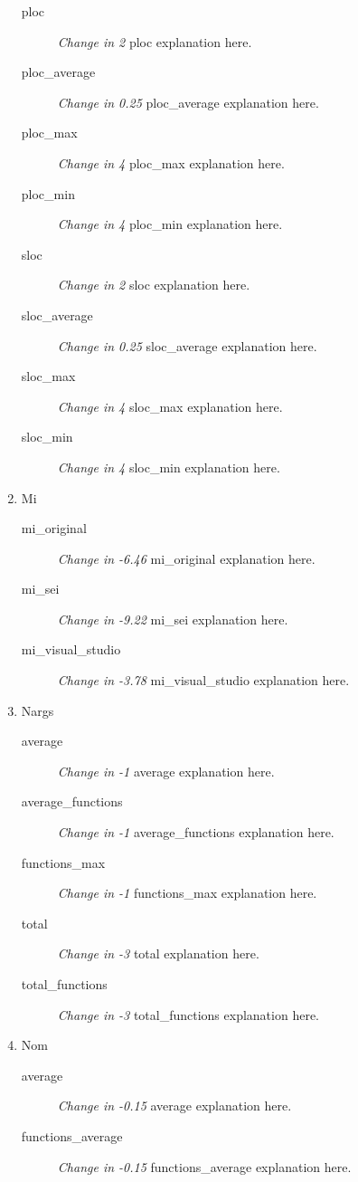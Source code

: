 \begin{enumerate}
\begin{description}
                  \item [ploc] \textit{Change in 2} ploc explanation here.
                  \item [ploc\_average] \textit{Change in 0.25} ploc\_average explanation here.
                  \item [ploc\_max] \textit{Change in 4} ploc\_max explanation here.
                  \item [ploc\_min] \textit{Change in 4} ploc\_min explanation here.
                  \item [sloc] \textit{Change in 2} sloc explanation here.
                  \item [sloc\_average] \textit{Change in 0.25} sloc\_average explanation here.
                  \item [sloc\_max] \textit{Change in 4} sloc\_max explanation here.
                  \item [sloc\_min] \textit{Change in 4} sloc\_min explanation here.
            \end{description}
      \item Mi
            \begin{description}
                  \item [mi\_original] \textit{Change in -6.46} mi\_original explanation here.
                  \item [mi\_sei] \textit{Change in -9.22} mi\_sei explanation here.
                  \item [mi\_visual\_studio] \textit{Change in -3.78} mi\_visual\_studio explanation here.
            \end{description}
      \item Nargs
            \begin{description}
                  \item [average] \textit{Change in -1} average explanation here.
                  \item [average\_functions] \textit{Change in -1} average\_functions explanation here.
                  \item [functions\_max] \textit{Change in -1} functions\_max explanation here.
                  \item [total] \textit{Change in -3} total explanation here.
                  \item [total\_functions] \textit{Change in -3} total\_functions explanation here.
            \end{description}
      \item Nom
            \begin{description}
                  \item [average] \textit{Change in -0.15} average explanation here.
                  \item [functions\_average] \textit{Change in -0.15} functions\_average explanation here.
            \end{description}
\end{enumerate}
